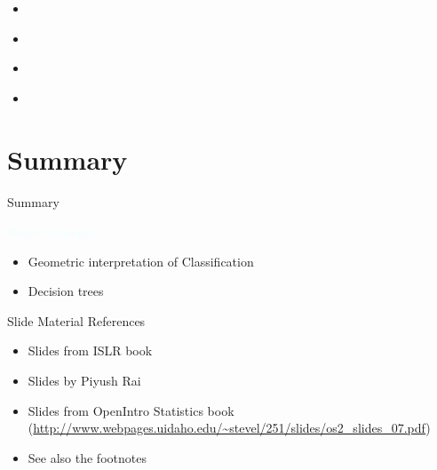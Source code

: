 \documentclass{beamer}
\newcommand{\tblue}[1]{{\Large {\textcolor{azure}{#1}}}}
\begin{document}
\begin{frame}{}
    \begin{itemize}
        \item 
    \end{itemize}
\end{frame}


\begin{frame}{}
    \begin{itemize}
        \item 
    \end{itemize}
\end{frame}


\begin{frame}{}
    \begin{itemize}
        \item 
    \end{itemize}
\end{frame}


\begin{frame}{}
    \begin{itemize}
        \item 
    \end{itemize}
\end{frame}


\section{Summary}
\begin{frame}{Summary}

\tblue{Major Concepts:}
\begin{itemize}
    \item Geometric interpretation of Classification
    \item Decision trees
\end{itemize}
\end{frame}

\begin{frame}{Slide Material References}
\begin{itemize}
    \item Slides from ISLR book
    \item Slides by Piyush Rai
    \item Slides from OpenIntro Statistics book (\url{http://www.webpages.uidaho.edu/~stevel/251/slides/os2_slides_07.pdf})
    \item See also the footnotes
\end{itemize}
\end{frame}
\end{document}
